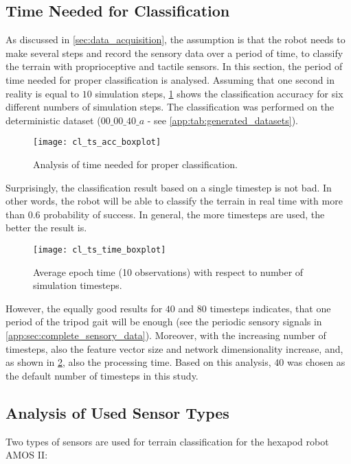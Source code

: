 \subsection{Time Needed for Classification} \label{ssec:number_of_timesteps}
As discussed in \cref{sec:data_acquisition}, the assumption is that the robot needs to make several steps and record the sensory data over a period of time, to classify the terrain with proprioceptive and tactile sensors. In this section, the period of time needed for proper classification is analysed. Assuming that one second in reality is equal to $ 10 $ simulation steps, \cref{fig:ts_acc_boxplot} shows the classification accuracy for six different numbers of simulation steps. The classification was performed on the deterministic dataset ($ 00\_00\_40\_a $ - see \cref{app:tab:generated_datasets}).

\begin{figure}[H]
  \centering
  \texttt{[image: cl\_ts\_acc\_boxplot]}
  \caption{Analysis of time needed for proper classification.}
  \label{fig:ts_acc_boxplot}
\end{figure}

Surprisingly, the classification result based on a single timestep is not bad. In other words, the robot will be able to classify the terrain in real time with more than $ 0.6 $ probability of success. In general, the more timesteps are used, the better the result is.

\begin{figure}[H]
  \centering
  \texttt{[image: cl\_ts\_time\_boxplot]}
  \caption{Average epoch time (10 observations) with respect to number of simulation timesteps.}
  \label{fig:ts_time_boxplot}
\end{figure}

However, the equally good results for $ 40 $ and $ 80 $ timesteps indicates, that one period of the tripod gait will be enough (see the periodic sensory signals in \cref{app:sec:complete_sensory_data}). Moreover, with the increasing number of timesteps, also the feature vector size and network dimensionality increase, and, as shown in \cref{fig:ts_time_boxplot}, also the processing time. Based on this analysis, $ 40 $ was chosen as the default number of timesteps in this study. 

\subsection{Analysis of Used Sensor Types} \label{ssec:analysis_of_used_sensor_types}
Two types of sensors are used for terrain classification for the hexapod robot AMOS II:

